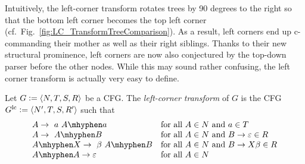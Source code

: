 Intuitively, the left-corner transform rotates trees by 90 degrees to the right so that the bottom left corner becomes the top left corner (cf.\ Fig.~\ref{fig:LC_TransformTreeComparison}).
As a result, left corners end up c-commanding their mother as well as their right siblings.
Thanks to their new structural prominence, left corners are now also conjectured by the top-down parser before the other nodes.
While this may sound rather confusing, the left corner transform is actually very easy to define.
%
\begin{definition}
    Let $G \mathrel{\mathop:}= \left \langle N, T, S, R \right \rangle $ be a CFG\@.
    The \emph{left-corner transform} of $G$ is the CFG $G^{\mathrm{lc}} \mathrel{\mathop:}= \left \langle N', T, S, R' \right \rangle $ such that
    \[
        \begin{array}{ll}
            A \rewrite\ a\ A\mhyphen a               & \text{for all $A \in N$ and $a \in T$}\\
            A \rewrite\ A\mhyphen B                  & \text{for all $A \in N$ and $B \rewrite \emptystring \in R$}\\ A\mhyphen X \rewrite\ \beta\ A\mhyphen B & \text{for all $A \in N$ and $B \rewrite X \beta \in R$}\\
            A\mhyphen A \rewrite \emptystring        & \text{for all $A \in N$}
        \end{array}
    \]
\end{definition}
%
